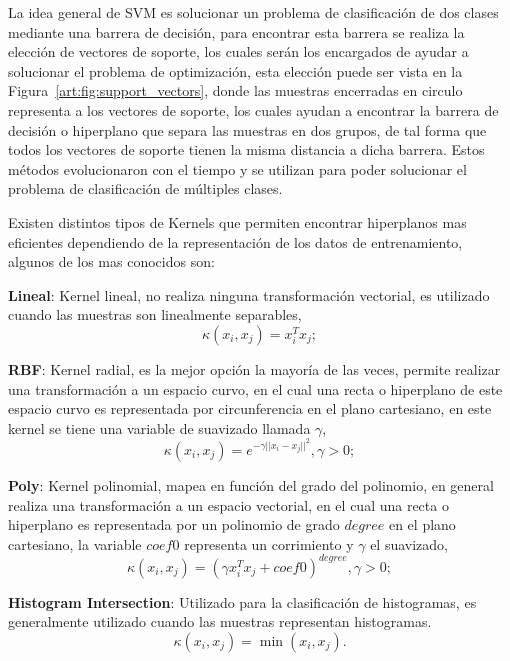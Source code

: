 	La idea general de SVM es solucionar un problema de clasificación de dos clases mediante una barrera de decisión, para encontrar esta barrera se realiza la elección de vectores de soporte, los cuales serán los encargados de ayudar a solucionar el problema de optimización, esta elección puede ser vista en la Figura~\ref{art:fig:support_vectors}, donde las muestras encerradas en circulo representa a los vectores de soporte, los cuales ayudan a encontrar la barrera de decisión o hiperplano que separa las muestras en dos grupos, de tal forma que todos los vectores de soporte tienen la misma distancia a dicha barrera. Estos métodos evolucionaron con el tiempo y se utilizan para poder solucionar el problema de clasificación de múltiples clases.

	Existen distintos tipos de Kernels que permiten encontrar hiperplanos mas eficientes dependiendo de la representación de los datos de entrenamiento, algunos de los mas conocidos son:

	\textbf{Lineal}: Kernel lineal, no realiza ninguna transformación vectorial, es utilizado cuando las muestras son linealmente separables,
	\begin{equation}
	\kappa(x_i,x_j) = x_{i}^{T}x_j;
	\label{k:lineal}
	\end{equation}
	
	\textbf{RBF}: Kernel radial, es la mejor opción la mayoría de las veces, permite realizar una transformación a un espacio curvo, en el cual una recta o hiperplano de este espacio curvo es representada por circunferencia en el plano cartesiano, en este kernel se tiene una variable de suavizado llamada $\gamma$,
	\begin{equation}
	\kappa(x_i,x_j) = e^{-\gamma||x_i - x_j||^2 }, \gamma > 0;
	\label{k:RBF}
	\end{equation}
	
	\textbf{Poly}: Kernel polinomial, mapea en función del grado del polinomio, en general realiza una transformación a un espacio vectorial, en el cual una recta o hiperplano es representada por un polinomio de grado $degree$ en el plano cartesiano, la variable $coef0$ representa un corrimiento y $\gamma$ el suavizado,
	\begin{equation}
	\kappa(x_i,x_j) = (\gamma x_{i}^{T}x_j + coef0)^{degree}, \gamma > 0;
	\label{k:Poly}
	\end{equation}

	\textbf{Histogram Intersection}: Utilizado para la clasificación de histogramas, es generalmente utilizado cuando las muestras representan histogramas.
	\begin{equation}
	\kappa(x_i,x_j) = \min(x_i,x_j).
	\label{k:Inter}
	\end{equation}


